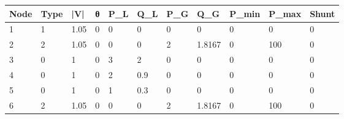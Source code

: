 \begin{tabular}{lllllllllll}
Node & Type & |V| & θ & P_L & Q_L & P_G & Q_G & P_min & P_max & Shunt \\ 
\hline 
1 & 1 & 1.05 & 0 & 0 & 0 & 0 & 0 & 0 & 0 & 0 \\ 
2 & 2 & 1.05 & 0 & 0 & 0 & 2 & 1.8167 & 0 & 100 & 0 \\ 
3 & 0 & 1 & 0 & 3 & 2 & 0 & 0 & 0 & 0 & 0 \\ 
4 & 0 & 1 & 0 & 2 & 0.9 & 0 & 0 & 0 & 0 & 0 \\ 
5 & 0 & 1 & 0 & 1 & 0.3 & 0 & 0 & 0 & 0 & 0 \\ 
6 & 2 & 1.05 & 0 & 0 & 0 & 2 & 1.8167 & 0 & 100 & 0 \\ 
\hline 
\end{tabular}